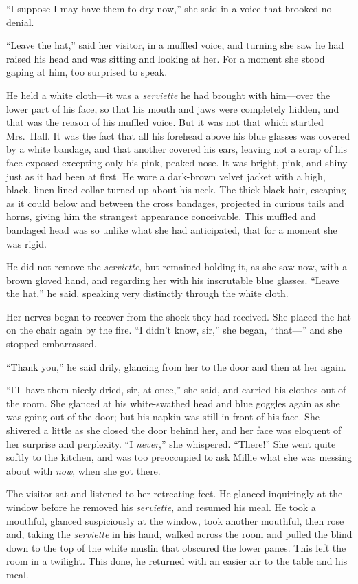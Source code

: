 “I suppose I may have them to dry now,” she said in a voice that brooked no denial.

“Leave the hat,” said her visitor, in a muffled voice, and turning she saw he had raised his head and was sitting and looking at her. For a moment she stood gaping at him, too surprised to speak.

He held a white cloth—it was a \emph{serviette} he had brought with him—over the lower part of his face, so that his mouth and jaws were completely hidden, and that was the reason of his muffled voice. But it was not that which startled Mrs.\ Hall. It was the fact that all his forehead above his blue glasses was covered by a white bandage, and that another covered his ears, leaving not a scrap of his face exposed excepting only his pink, peaked nose. It was bright, pink, and shiny just as it had been at first. He wore a dark-brown velvet jacket with a high, black, linen-lined collar turned up about his neck. The thick black hair, escaping as it could below and between the cross bandages, projected in curious tails and horns, giving him the strangest appearance conceivable. This muffled and bandaged head was so unlike what she had anticipated, that for a moment she was rigid.

He did not remove the \emph{serviette}, but remained holding it, as she saw now, with a brown gloved hand, and regarding her with his inscrutable blue glasses. “Leave the hat,” he said, speaking very distinctly through the white cloth.

Her nerves began to recover from the shock they had received. She placed the hat on the chair again by the fire. “I didn’t know, sir,” she began, “that—” and she stopped embarrassed.

“Thank you,” he said drily, glancing from her to the door and then at her again.

“I’ll have them nicely dried, sir, at once,” she said, and carried his clothes out of the room. She glanced at his white-swathed head and blue goggles again as she was going out of the door; but his napkin was still in front of his face. She shivered a little as she closed the door behind her, and her face was eloquent of her surprise and perplexity. “I \emph{never},” she whispered. “There!” She went quite softly to the kitchen, and was too preoccupied to ask Millie what she was messing about with \emph{now}, when she got there.

The visitor sat and listened to her retreating feet. He glanced inquiringly at the window before he removed his \emph{serviette}, and resumed his meal. He took a mouthful, glanced suspiciously at the window, took another mouthful, then rose and, taking the \emph{serviette} in his hand, walked across the room and pulled the blind down to the top of the white muslin that obscured the lower panes. This left the room in a twilight. This done, he returned with an easier air to the table and his meal.

